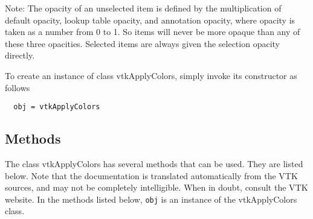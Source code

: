 Note: The opacity of an unselected item is defined by the multiplication
 of default opacity, lookup table opacity, and annotation opacity, where
 opacity is taken as a number from 0 to 1. So items will never be more opaque
 than any of these three opacities. Selected items are always given the
 selection opacity directly.

To create an instance of class vtkApplyColors, simply
invoke its constructor as follows
\begin{verbatim}
  obj = vtkApplyColors
\end{verbatim}
\subsection{Methods}

The class vtkApplyColors has several methods that can be used.
  They are listed below.
Note that the documentation is translated automatically from the VTK sources,
and may not be completely intelligible.  When in doubt, consult the VTK website.
In the methods listed below, \verb|obj| is an instance of the vtkApplyColors class.
